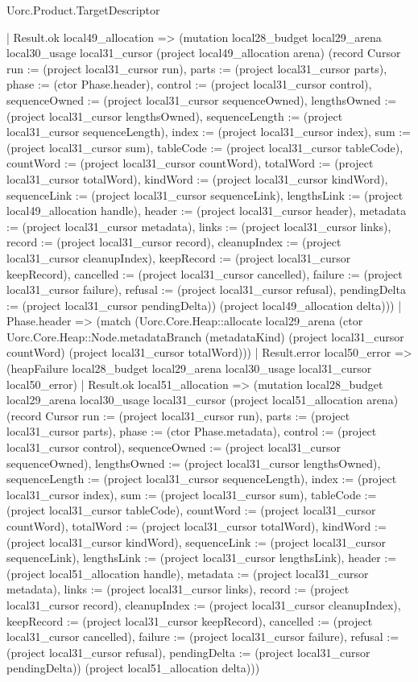 \begin{lexlean}{Uorc.Product.TargetDescriptor}
\begin{semanticmodule}
{      | Result.ok local49_allocation => (mutation local28_budget local29_arena local30_usage local31_cursor (project local49_allocation arena) (record Cursor {run := (project local31_cursor run), parts := (project local31_cursor parts), phase := (ctor Phase.header), control := (project local31_cursor control), sequenceOwned := (project local31_cursor sequenceOwned), lengthsOwned := (project local31_cursor lengthsOwned), sequenceLength := (project local31_cursor sequenceLength), index := (project local31_cursor index), sum := (project local31_cursor sum), tableCode := (project local31_cursor tableCode), countWord := (project local31_cursor countWord), totalWord := (project local31_cursor totalWord), kindWord := (project local31_cursor kindWord), sequenceLink := (project local31_cursor sequenceLink), lengthsLink := (project local49_allocation handle), header := (project local31_cursor header), metadata := (project local31_cursor metadata), links := (project local31_cursor links), record := (project local31_cursor record), cleanupIndex := (project local31_cursor cleanupIndex), keepRecord := (project local31_cursor keepRecord), cancelled := (project local31_cursor cancelled), failure := (project local31_cursor failure), refusal := (project local31_cursor refusal), pendingDelta := (project local31_cursor pendingDelta)}) (project local49_allocation delta)))
    | Phase.header => (match (Uorc.Core.Heap::allocate local29_arena (ctor Uorc.Core.Heap::Node.metadataBranch (metadataKind) (project local31_cursor countWord) (project local31_cursor totalWord)))
      | Result.error local50_error => (heapFailure local28_budget local29_arena local30_usage local31_cursor local50_error)
      | Result.ok local51_allocation => (mutation local28_budget local29_arena local30_usage local31_cursor (project local51_allocation arena) (record Cursor {run := (project local31_cursor run), parts := (project local31_cursor parts), phase := (ctor Phase.metadata), control := (project local31_cursor control), sequenceOwned := (project local31_cursor sequenceOwned), lengthsOwned := (project local31_cursor lengthsOwned), sequenceLength := (project local31_cursor sequenceLength), index := (project local31_cursor index), sum := (project local31_cursor sum), tableCode := (project local31_cursor tableCode), countWord := (project local31_cursor countWord), totalWord := (project local31_cursor totalWord), kindWord := (project local31_cursor kindWord), sequenceLink := (project local31_cursor sequenceLink), lengthsLink := (project local31_cursor lengthsLink), header := (project local51_allocation handle), metadata := (project local31_cursor metadata), links := (project local31_cursor links), record := (project local31_cursor record), cleanupIndex := (project local31_cursor cleanupIndex), keepRecord := (project local31_cursor keepRecord), cancelled := (project local31_cursor cancelled), failure := (project local31_cursor failure), refusal := (project local31_cursor refusal), pendingDelta := (project local31_cursor pendingDelta)}) (project local51_allocation delta)))
}
\end{semanticmodule}
\end{lexlean}
